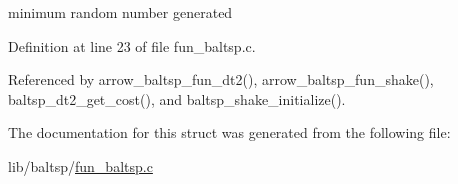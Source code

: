 minimum random number generated 

Definition at line 23 of file fun\_\-baltsp.c.

Referenced by arrow\_\-baltsp\_\-fun\_\-dt2(), arrow\_\-baltsp\_\-fun\_\-shake(), baltsp\_\-dt2\_\-get\_\-cost(), and baltsp\_\-shake\_\-initialize().

The documentation for this struct was generated from the following file:\begin{CompactItemize}
\item 
lib/baltsp/\hyperlink{fun__baltsp_8c}{fun\_\-baltsp.c}\end{CompactItemize}
